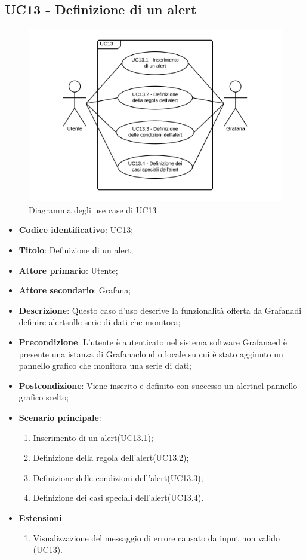 \subsection{UC13 - Definizione di un alert}
\begin{figure}[H]
\includegraphics{img/UC13_-_Definizione_di_un_alert.png}
\caption{Diagramma degli use case di UC13}
\end{figure}
\begin{itemize}
	\item \textbf{Codice identificativo}: UC13;
	\item \textbf{Titolo}: Definizione di un alert\glo;
	\item \textbf{Attore primario}: Utente;
	\item \textbf{Attore secondario}: Grafana\glo;
	\item \textbf{Descrizione}: Questo caso d'uso descrive la funzionalità offerta da Grafana\glosp di definire alert\glosp sulle serie di dati che monitora;
	\item \textbf{Precondizione}: L'utente è autenticato nel sistema software Grafana\glosp ed è presente una istanza di Grafana\glosp cloud o locale su cui è stato aggiunto un pannello grafico che monitora una serie di dati;
	\item \textbf{Postcondizione}: Viene inserito e definito con successo un alert\glosp nel pannello grafico scelto;
	\item \textbf{Scenario principale}: 
	\begin{enumerate}
		\item Inserimento di un alert\glosp (UC13.1);
		\item Definizione della regola dell'alert\glosp (UC13.2);
		\item Definizione delle condizioni dell'alert\glosp (UC13.3);
		\item Definizione dei casi speciali dell'alert\glosp (UC13.4).
	\end{enumerate}

	\item \textbf{Estensioni}:	
	\begin{enumerate}
		\item Visualizzazione del messaggio di errore causato da input non valido (UC13).
	\end{enumerate}
\end{itemize}

